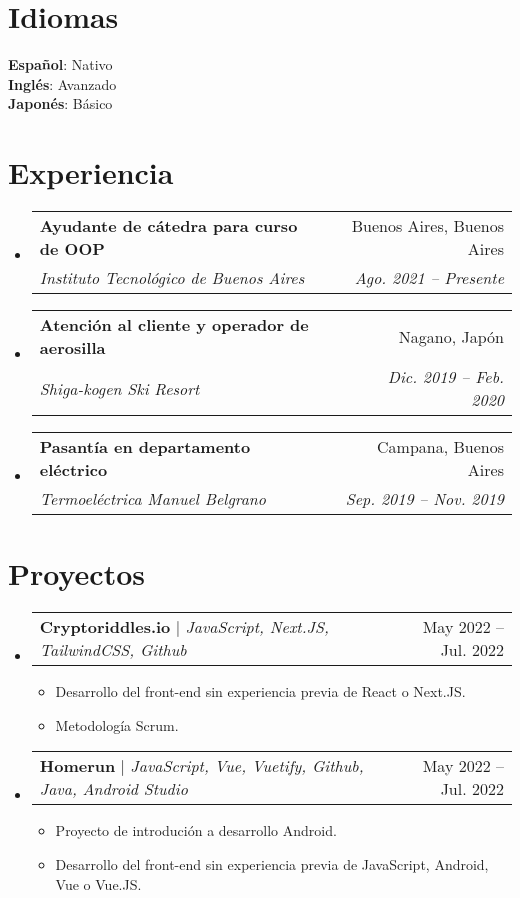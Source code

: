 \documentclass[letterpaper,11pt]{article}
\makeatletter
\newcommand{\resumeItem}[1]{
  \item\small{
    {#1 \vspace{-2pt}}
  }
}
\newcommand{\resumeSubheading}[4]{
  \vspace{-2pt}\item
    \begin{tabular*}{0.97\textwidth}[t]{l@{\extracolsep{\fill}}r}
      \textbf{#1} & #2 \\
      \textit{\small#3} & \textit{\small #4} \\
    \end{tabular*}\vspace{-7pt}
}
\newcommand{\resumeSubSubheading}[2]{
    \item
    \begin{tabular*}{0.97\textwidth}{l@{\extracolsep{\fill}}r}
      \textit{\small#1} & \textit{\small #2} \\
    \end{tabular*}\vspace{-7pt}
}
\newcommand{\resumeProjectHeading}[2]{
    \item
    \begin{tabular*}{0.97\textwidth}{l@{\extracolsep{\fill}}r}
      \small#1 & #2 \\
    \end{tabular*}\vspace{-7pt}
}
\newcommand{\resumeSubHeadingListStart}{\begin{itemize}[leftmargin=0.15in, label={}]}
\newcommand{\resumeSubHeadingListEnd}{\end{itemize}}
\newcommand{\resumeItemListStart}{\begin{itemize}}
\newcommand{\resumeItemListEnd}{\end{itemize}\vspace{-5pt}}
\makeatother
\begin{document}
\section{Idiomas}
 \begin{itemize}[leftmargin=0.15in, label={}]
    \small{\item{
     \textbf{Español}{: Nativo} \\
     \textbf{Inglés}{: Avanzado} \\
     \textbf{Japonés}{: Básico}
    }}
 \end{itemize}


\section{Experiencia}
  \resumeSubHeadingListStart
  \resumeSubheading
  {Ayudante de cátedra para curso de OOP}{Buenos Aires, Buenos Aires}
  {Instituto Tecnológico de Buenos Aires}{Ago. 2021 -- Presente}
  \resumeSubheading
  {Atención al cliente y operador de aerosilla}{Nagano, Japón}
  {Shiga-kogen Ski Resort}{Dic. 2019 -- Feb. 2020}
    \resumeSubheading
    {Pasantía en departamento eléctrico}{Campana, Buenos Aires}
      {Termoeléctrica Manuel Belgrano}{Sep. 2019 -- Nov. 2019}


   

  \resumeSubHeadingListEnd


\section{Proyectos}
    \resumeSubHeadingListStart
      \resumeProjectHeading
          {\textbf{Cryptoriddles.io} $|$ \emph{JavaScript, Next.JS, TailwindCSS, Github}}{May 2022 -- Jul. 2022}
          \resumeItemListStart
            \resumeItem{Desarrollo del front-end sin experiencia previa de React o Next.JS.}
            \resumeItem{Metodología Scrum.}
          \resumeItemListEnd
      \resumeProjectHeading
          {\textbf{Homerun} $|$ \emph{JavaScript, Vue, Vuetify, Github, Java, Android Studio}}{May 2022 -- Jul. 2022}
          \resumeItemListStart
          \resumeItem{Proyecto de introdución a desarrollo Android.}
            \resumeItem{Desarrollo del front-end sin experiencia previa de JavaScript, Android, Vue o Vue.JS.}
          \resumeItemListEnd
    \resumeSubHeadingListEnd
\end{document}
